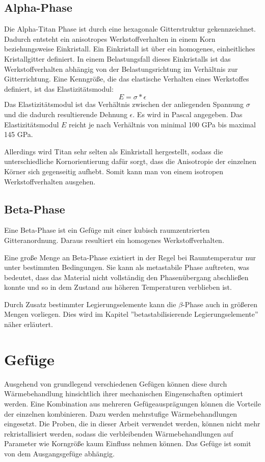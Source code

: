 \documentclass[a4paper, 11pt]{tubsreprt}
\begin{document}
\subsection{Alpha-Phase}
Die Alpha-Titan Phase ist durch eine hexagonale Gitterstruktur gekennzeichnet. Dadurch entsteht ein anisotropes Werkstoffverhalten in einem Korn beziehungsweise Einkristall.
Ein Einkristall ist über ein homogenes, einheitliches Kristallgitter definiert.
In einem Belastungsfall dieses Einkristalls ist das Werkstoffverhalten abhängig von der Belastungsrichtung im Verhältnis zur Gitterrichtung. Eine Kenngröße, die das elastische Verhalten eines Werkstoffes definiert, ist das Elastizitätsmodul: 
\begin{equation}
E=\sigma*\epsilon
\end{equation}
Das Elastizitätsmodul ist das Verhältnis zwischen der anliegenden Spannung $\sigma$ und die dadurch resultierende Dehnung $\epsilon$.
Es wird in Pascal angegeben. Das Elastizitätsmodul $E$ reicht je nach Verhältnis von minimal 100 GPa bis maximal 145 GPa. 

Allerdings wird Titan sehr selten als Einkristall hergestellt, sodass die unterschiedliche Kornorientierung dafür sorgt, dass die Anisotropie der einzelnen Körner sich gegenseitig aufhebt. Somit kann man von einem isotropen Werkstoffverhalten ausgehen.


\subsection{Beta-Phase}
Eine Beta-Phase ist ein Gefüge mit einer kubisch raumzentrierten Gitteranordnung. Daraus resultiert ein homogenes Werkstoffverhalten.

Eine große Menge an Beta-Phase existiert in der Regel bei Raumtemperatur nur unter bestimmten Bedingungen. Sie kann als metastabile Phase auftreten, was bedeutet, dass das Material nicht vollständig den Phasenübergang abschließen konnte und so in dem Zustand aus höheren Temperaturen verblieben ist.  

Durch Zusatz bestimmter Legierungselemente kann die $\beta$-Phase auch in größeren Mengen vorliegen. Dies wird im Kapitel ''betastabilisierende Legierungselemente'' näher erläutert.
\section{Gefüge}



Ausgehend von grundlegend verschiedenen Gefügen können diese durch Wärmebehandlung hinsichtlich ihrer mechanischen Eingenschaften optimiert werden. Eine Kombination aus mehreren Gefügeausprägungen können die Vorteile der einzelnen kombinieren. Dazu werden mehrstufige Wärmebehandlungen eingesetzt. Die Proben, die in dieser Arbeit verwendet werden, können nicht mehr rekristallisiert werden, sodass die verbleibenden Wärmebehandlungen auf Parameter wie Korngröße kaum Einfluss nehmen können. Das Gefüge ist somit von dem Ausgangsgefüge abhängig.  
\end{document}
